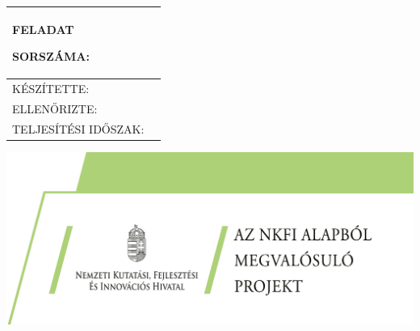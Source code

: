 {\begin{titlepage}
\begin{center}
	\vspace{3.5cm}
	
	\begin{table}[H]
		\centering
		\begin{tabular}{|m{4.5cm}|m{8.3cm}|}
			
			\hline\vspace{5pt}
			
			\large{FELADAT \par SORSZÁMA:} & 
			\vspace{5pt}\large{\gettasknumber} \\ 
			\hline\vspace{5pt}
			
			\large{KÉSZÍTETTE:} & 
			\vspace{5pt}\large{\@author} \\ 
			\hline\vspace{5pt}
			
			\large{ELLENŐRIZTE:} & 
			\vspace{5pt}\large{\getcheckedby}\\
			\hline\vspace{5pt}
			
			\large{TELJESÍTÉSI IDŐSZAK:}    & 
			\vspace{5pt}\large{\getperiodofperformance} \\
			\hline
			
		\end{tabular}
	\end{table}
	
	
	\end{center}
        \begin{changemargin}{0.7cm}{0.7cm}	%
            \enlargethispage{4.4cm}	%
            
            \vfill
            \begin{minipage}{\paperwidth}
                
                \hspace*{7.3cm}		%
                \includegraphics*[height = 4 cm]{src/infoblokk_jo} 
            \end{minipage} 
        \end{changemargin}
    \end{titlepage}  
}
\makeatother	%


\usepackage{pdfpages}
\usepackage{caption}

\makeatletter
\def\fps@figure{htbp}
\makeatother



